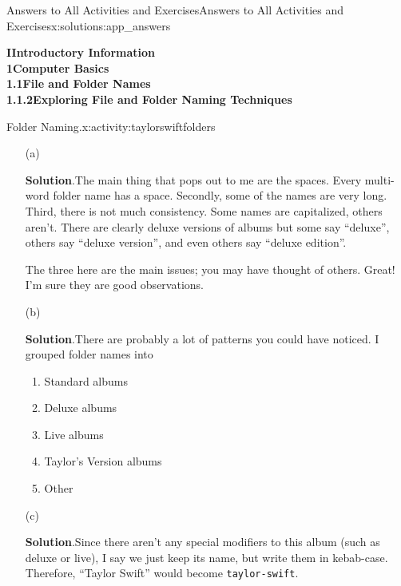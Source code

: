 \documentclass[oneside,10pt,]{book}
\newcommand{\blocktitlefont}{\relax}
\newcommand{\mono}[1]{\texttt{#1}}
\begin{document}
\begin{solutions-chapter}{Answers to All Activities and Exercises}{}{Answers to All Activities and Exercises}{}{}{x:solutions:app_answers}
\par\medskip
\noindent\textbf{\Large{}I\space\textperiodcentered\space{}Introductory Information\\
1\space\textperiodcentered\space{}Computer Basics\\
1.1\space\textperiodcentered\space{}File and Folder Names\\
1.1.2\space\textperiodcentered\space{}Exploring File and Folder Naming Techniques}
\begin{activitysolution}{1.1}{Folder Naming.}{x:activity:taylorswiftfolders}%
\begin{enumerate}[font=\bfseries,label=(\alph*),ref=\alph*]
\item[(a)]\par\smallskip%
\noindent\textbf{\blocktitlefont Solution}.\hypertarget{g:solution:idp615108648-back}{}\quad{}The main thing that pops out to me are the spaces. Every multi-word folder name has a space. Secondly, some of the names are very long. Third, there is not much consistency. Some names are capitalized, others aren't. There are clearly deluxe versions of albums but some say ``deluxe'', others say ``deluxe version'', and even others say ``deluxe edition''.%
\par
The three here are the main issues; you may have thought of others. Great! I'm sure they are good observations.%
\item[(b)]\par\smallskip%
\noindent\textbf{\blocktitlefont Solution}.\hypertarget{g:solution:idp615105064-back}{}\quad{}There are probably a lot of patterns you could have noticed. I grouped folder names into%
\begin{enumerate}[label=\arabic*]
\item{}Standard albums%
\item{}Deluxe albums%
\item{}Live albums%
\item{}Taylor's Version albums%
\item{}Other%
\end{enumerate}
%
\item[(c)]\par\smallskip%
\noindent\textbf{\blocktitlefont Solution}.\hypertarget{g:solution:idp615112104-back}{}\quad{}Since there aren't any special modifiers to this album (such as deluxe or live), I say we just keep its name, but write them in kebab-case. Therefore, ``Taylor Swift'' would become \mono{taylor-swift}.%

\end{enumerate}
\end{activitysolution}
\end{solutions-chapter}
\end{document}
